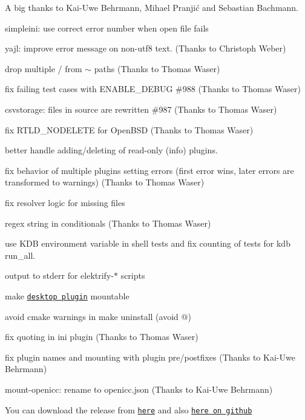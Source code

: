 A big thanks to Kai-\/\+Uwe Behrmann, Mihael Pranjić and Sebastian Bachmann.


\begin{DoxyItemize}
\item simpleini\+: use correct error number when open file fails
\item yajl\+: improve error message on non-\/utf8 text. (Thanks to Christoph Weber)
\item drop multiple {\ttfamily /} from {\ttfamily $\sim$} paths (Thanks to Thomas Waser)
\item fix failing test cases with {\ttfamily E\+N\+A\+B\+L\+E\+\_\+\+D\+E\+B\+UG} \#988 (Thanks to Thomas Waser)
\item csvstorage\+: files in source are rewritten \#987 (Thanks to Thomas Waser)
\item fix R\+T\+L\+D\+\_\+\+N\+O\+D\+E\+L\+E\+TE for Open\+B\+SD (Thanks to Thomas Waser)
\item better handle adding/deleting of read-\/only (info) plugins.
\item fix behavior of multiple plugins setting errors (first error wins, later errors are transformed to warnings) (Thanks to Thomas Waser)
\item fix resolver logic for missing files
\item regex string in conditionals (Thanks to Thomas Waser)
\item use {\ttfamily K\+DB} environment variable in shell tests and fix counting of tests for {\ttfamily kdb run\+\_\+all}.
\item output to {\ttfamily stderr} for {\ttfamily elektrify-\/$\ast$} scripts
\item make \href{https://master.libelektra.org/src/plugins/desktop}{\tt desktop plugin} mountable
\item avoid cmake warnings in {\ttfamily make uninstall} (avoid {\ttfamily @})
\item fix quoting in ini plugin (Thanks to Thomas Waser)
\item fix plugin names and mounting with plugin pre/postfixes (Thanks to Kai-\/\+Uwe Behrmann)
\item mount-\/openicc\+: rename to openicc.\+json (Thanks to Kai-\/\+Uwe Behrmann)
\end{DoxyItemize}

You can download the release from \href{https://www.libelektra.org/ftp/elektra/releases/elektra-0.8.19.tar.gz}{\tt here} and also \href{https://github.com/ElektraInitiative/ftp/tree/master/releases/elektra-0.8.19.tar.gz}{\tt here on github}


